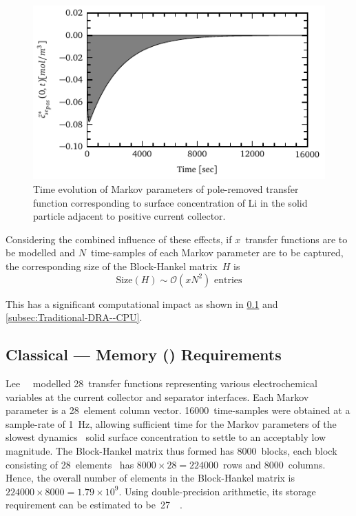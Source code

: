\begin{figure}[!htbp]
    \centering
    \includegraphics{chapters/dra/figures/markov_decay.pdf}
    \caption[Markov parameters of solid surface concentration at positive
    current collector]{Time evolution of Markov parameters of pole-removed transfer
        function corresponding to surface concentration of Li in the solid particle
    adjacent to positive current collector.}
    \label{fig:markov_cse_pos}
\end{figure}

Considering the combined  influence of these effects,  if $x$~transfer functions
are  to be  modelled and  $N$~time-samples of  each Markov  parameter are  to be
captured, the corresponding size of the Block-Hankel matrix~$H$ is
\begin{equation}
    \text{Size}(H)\sim \mathcal{O}(x N^2)\text{ entries}
\end{equation}

This    has    a    significant     computational    impact    as    shown    in
\cref{subsec:Traditional-DRA--Memory} and \cref{subsec:Traditional-DRA--CPU}.

\subsection{Classical  --- Memory () Requirements}\label{subsec:Traditional-DRA--Memory}

Lee~\etal~\cite{Lee2012a}  modelled 28~transfer  functions representing  various
electrochemical  variables at  the current  collector and  separator interfaces.
Each Markov  parameter is  a 28~element  column vector.  16000~time-samples were
obtained at  a sample-rate of  \SI{1}{\hertz}, allowing sufficient time  for the
Markov parameters  of the  slowest dynamics  \ie~solid surface  concentration to
settle  to an  acceptably low  magnitude.  The Block-Hankel  matrix thus  formed
has  8000~blocks, each  block  consisting of  28~elements  \ie~has $8000  \times
28=224000$~rows  and 8000~columns.  Hence,  the overall  number  of elements  in
the  Block-Hankel matrix  is~${224000  \times 8000=1.79  \times 10^{9}}$.  Using
double-precision  arithmetic,  its  storage  requirement  can  be  estimated  to
be~\approx\SI{27}{\giga\byte}.

